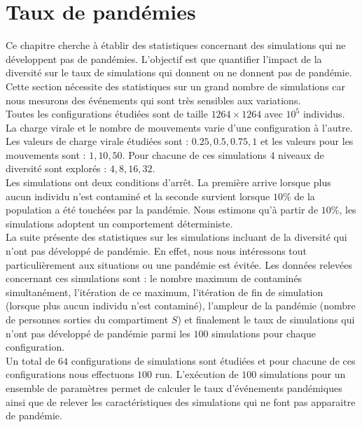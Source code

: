 \section{Taux de pandémies}

Ce chapitre cherche à établir des statistiques concernant des simulations qui ne développent pas de pandémies. L'objectif est que quantifier l'impact de la diversité sur le taux de simulations qui donnent ou ne donnent pas de pandémie. Cette section nécessite des statistiques sur un grand nombre de simulations car nous mesurons des événements qui sont très sensibles aux variations.\\

Toutes les configurations étudiées sont de taille $1264 \times 1264$ avec $10^5$ individus. La charge virale et le nombre de mouvements varie d’une configuration à l’autre. Les valeurs de charge virale étudiées sont : $0.25,0.5,0.75,1$ et les valeurs pour les mouvements sont : $1,10,50$. Pour chacune de ces simulations $4$ niveaux de diversité sont explorés : $4,8,16,32$.\\

Les simulations ont deux conditions d'arrêt. La première arrive lorsque plus aucun individu n'est contaminé et la seconde survient lorsque $10\%$ de la population a été touchées par la pandémie. Nous estimons qu'à partir de $10\%$, les simulations adoptent un comportement déterministe.\\ 

La suite présente des statistiques sur les simulations incluant de la diversité qui n'ont pas développé de pandémie. En effet, nous nous intéressons tout particulièrement aux situations ou une pandémie est évitée. Les données relevées concernant ces simulations sont : le nombre maximum de contaminés simultanément, l'itération de ce maximum, l'itération de fin de simulation (lorsque plus aucun individu n'est contaminé), l'ampleur de la pandémie (nombre de personnes sorties du compartiment $S$) et finalement le taux de simulations qui n'ont pas développé de pandémie parmi les $100$ simulations pour chaque configuration.\\

Un total de $64$ configurations de simulations sont étudiées et pour chacune de ces configurations nous effectuons $100$ run. L'exécution de $100$ simulations pour un ensemble de paramètres permet de calculer le taux d'événements pandémiques ainsi que de relever les caractéristiques des simulations qui ne font pas apparaitre de pandémie.

